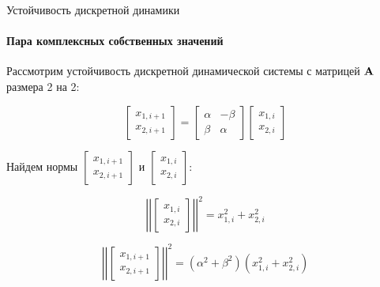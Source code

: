 \documentclass{beamer}
\begin{document}
\begin{frame}{Устойчивость дискретной динамики}
	\framesubtitle{Пара комплексных собственных значений}
	\begin{flushleft}
		
		Рассмотрим устойчивость дискретной динамической системы с матрицей $\mathbf{A}$ размера 2 на 2:
		
		\begin{equation}
			\begin{bmatrix}
				x_{1, i+1} \\ x_{2, i+1}
			\end{bmatrix}
			= 
			\begin{bmatrix}
				\alpha & -\beta \\ \beta & \alpha
			\end{bmatrix}     
			\begin{bmatrix}
				x_{1, i} \\ x_{2, i}
			\end{bmatrix}
		\end{equation}	
		
		Найдем нормы $\begin{bmatrix}
			x_{1, i+1} \\ x_{2, i+1}
		\end{bmatrix}$ и $\begin{bmatrix}
			x_{1, i} \\ x_{2, i}
		\end{bmatrix}$:
		
		\begin{equation}
			\left | \left|
			\begin{bmatrix}
				x_{1, i} \\ x_{2, i}
			\end{bmatrix}
			\right | \right|^2
			= 
			x_{1, i}^2 + x_{2, i}^2
		\end{equation}
		
		\begin{equation}
			\left | \left|
			\begin{bmatrix}
				x_{1, i+1} \\ x_{2, i+1}
			\end{bmatrix}
			\right | \right|^2
			= 
			(\alpha^2 + \beta^2) (x_{1, i}^2 + x_{2, i}^2)
		\end{equation}
		
	\end{flushleft}
\end{frame}
\end{document}
